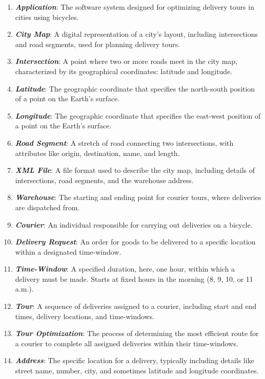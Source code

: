 \documentclass{article}
\begin{document}
\begin{enumerate}
    \item \textbf{\textit{Application}}: The software system designed for optimizing delivery tours in cities using bicycles.
    \item \textbf{\textit{City Map}}: A digital representation of a city's layout, including intersections and road segments, used for planning delivery tours.
    \item \textbf{\textit{Intersection}}: A point where two or more roads meet in the city map, characterized by its geographical coordinates: latitude and longitude.
    \item \textbf{\textit{Latitude}}: The geographic coordinate that specifies the north-south position of a point on the Earth's surface.
    \item \textbf{\textit{Longitude}}: The geographic coordinate that specifies the east-west position of a point on the Earth's surface.
    \item \textbf{\textit{Road Segment}}: A stretch of road connecting two intersections, with attributes like origin, destination, name, and length.
    \item \textbf{\textit{XML File}}: A file format used to describe the city map, including details of intersections, road segments, and the warehouse address.
    \item \textbf{\textit{Warehouse}}: The starting and ending point for courier tours, where deliveries are dispatched from.
    \item \textbf{\textit{Courier}}: An individual responsible for carrying out deliveries on a bicycle.
    \item \textbf{\textit{Delivery Request}}: An order for goods to be delivered to a specific location within a designated time-window.
    \item \textbf{\textit{Time-Window}}: A specified duration, here, one hour, within which a delivery must be made. Starts at fixed hours in the morning (8, 9, 10, or 11 a.m.).
    \item \textbf{\textit{Tour}}: A sequence of deliveries assigned to a courier, including start and end times, delivery locations, and time-windows.
    \item \textbf{\textit{Tour Optimization}}: The process of determining the most efficient route for a courier to complete all assigned deliveries within their time-windows.
    \item \textbf{\textit{Address}}: The specific location for a delivery, typically including details like street name, number, city, and sometimes latitude and longitude coordinates.

\end{enumerate}
\end{document}
